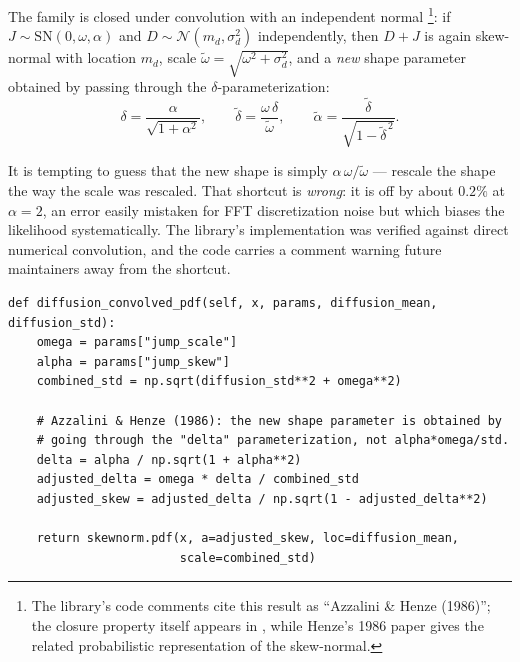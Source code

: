 The family is closed under convolution with an independent normal
\citep{Azzalini1986}\footnote{The library's code comments cite this
result as ``Azzalini \& Henze (1986)''; the closure property itself
appears in \citet{Azzalini1986}, while Henze's 1986 paper gives the
related probabilistic representation of the skew-normal.}: if $J \sim \mathrm{SN}(0, \omega, \alpha)$ and
$D \sim \mathcal N(m_d, \sigma_d^2)$ independently, then $D + J$ is again
skew-normal with location $m_d$, scale
$\tilde\omega = \sqrt{\omega^2 + \sigma_d^2}$, and a \emph{new} shape
parameter obtained by passing through the $\delta$-parameterization:
\begin{equation}
  \delta = \frac{\alpha}{\sqrt{1 + \alpha^2}},
  \qquad
  \tilde\delta = \frac{\omega\,\delta}{\tilde\omega},
  \qquad
  \tilde\alpha = \frac{\tilde\delta}{\sqrt{1 - \tilde\delta^{\,2}}}.
  \label{eq:sn-conv}
\end{equation}

\begin{decision}
\label{dec:delta}
It is tempting to guess that the new shape is simply
$\alpha\,\omega / \tilde\omega$ --- rescale the shape the way the scale was
rescaled. That shortcut is \emph{wrong}: it is off by about $0.2\%$ at
$\alpha = 2$, an error easily mistaken for FFT discretization noise but
which biases the likelihood systematically. The library's implementation
was verified against direct numerical convolution, and the code carries a
comment warning future maintainers away from the shortcut.
\end{decision}

\begin{lstlisting}[caption={Skew-normal convolution \eqref{eq:sn-conv} in \code{distributions/skew\_normal.py}.}]
def diffusion_convolved_pdf(self, x, params, diffusion_mean, diffusion_std):
    omega = params["jump_scale"]
    alpha = params["jump_skew"]
    combined_std = np.sqrt(diffusion_std**2 + omega**2)

    # Azzalini & Henze (1986): the new shape parameter is obtained by
    # going through the "delta" parameterization, not alpha*omega/std.
    delta = alpha / np.sqrt(1 + alpha**2)
    adjusted_delta = omega * delta / combined_std
    adjusted_skew = adjusted_delta / np.sqrt(1 - adjusted_delta**2)

    return skewnorm.pdf(x, a=adjusted_skew, loc=diffusion_mean,
                        scale=combined_std)
\end{lstlisting}

